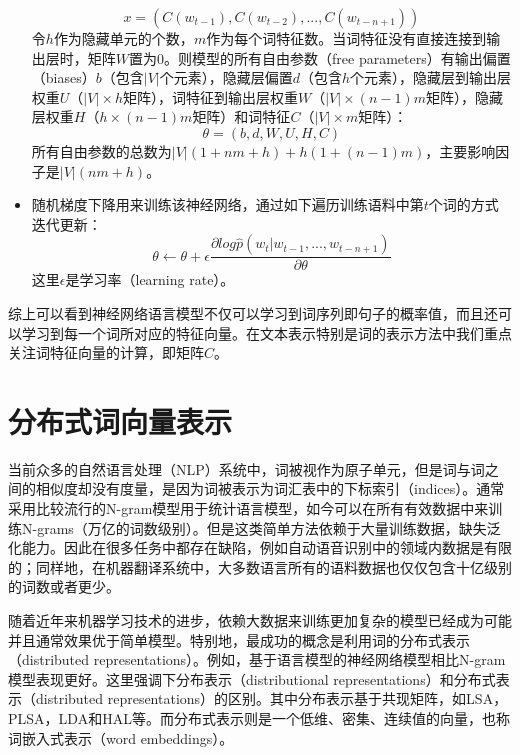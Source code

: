 \documentclass[master]{njuthesis}
\begin{document}
\begin{itemize}
		\begin{equation}
		x=(C(w_{t-1}), C(w_{t-2}), ..., C(w_{t-n+1}))
		\end{equation}
		令$h$作为隐藏单元的个数，$m$作为每个词特征数。当词特征没有直接连接到输出层时，矩阵$W$置为0。则模型的所有自由参数（free parameters）有输出偏置（biases）$b$（包含$|V|$个元素），隐藏层偏置$d$（包含$h$个元素），隐藏层到输出层权重$U$（$|V|\times h$矩阵），词特征到输出层权重$W$（$|V|\times (n-1)m$矩阵），隐藏层权重$H$（$h\times (n-1)m$矩阵）和词特征$C$（$|V|\times m$矩阵）：
		\begin{equation}
		\theta=(b,d,W,U,H,C)
		\end{equation}
		所有自由参数的总数为$|V|(1+nm+h)+h(1+(n-1)m)$，主要影响因子是$|V|(nm+h)$。
\item 随机梯度下降用来训练该神经网络，通过如下遍历训练语料中第$t$个词的方式迭代更新：
		\begin{equation}
		\theta \leftarrow \theta+\epsilon \frac{\partial log\hat{p}(w_t|w_{t-1}, ..., w_{t-n+1})}{\partial \theta}
		\end{equation}
		这里$\epsilon$是学习率（learning rate）。
\end{itemize}

综上可以看到神经网络语言模型不仅可以学习到词序列即句子的概率值，而且还可以学习到每一个词所对应的特征向量。在文本表示特别是词的表示方法中我们重点关注词特征向量的计算，即矩阵$C$。


\section{分布式词向量表示}\label{sec_chap2_word2vec}

当前众多的自然语言处理（NLP）系统中，词被视作为原子单元，但是词与词之间的相似度却没有度量，是因为词被表示为词汇表中的下标索引（indices）。通常采用比较流行的N-gram模型用于统计语言模型，如今可以在所有有效数据中来训练N-grams（万亿的词数级别\cite{brants2007large}）。但是这类简单方法依赖于大量训练数据，缺失泛化能力。因此在很多任务中都存在缺陷，例如自动语音识别中的领域内数据是有限的；同样地，在机器翻译系统中，大多数语言所有的语料数据也仅仅包含十亿级别的词数或者更少。

随着近年来机器学习技术的进步，依赖大数据来训练更加复杂的模型已经成为可能并且通常效果优于简单模型。特别地，最成功的概念是利用词的分布式表示（distributed representations）\cite{hinton1986learning}。例如，基于语言模型的神经网络模型相比N-gram模型表现更好\cite{bengio2003neural,schwenk2007continuous}。这里强调下分布表示（distributional representations）和分布式表示（distributed representations）的区别。其中分布表示基于共现矩阵，如LSA\cite{landauer1998introduction}，PLSA\cite{hofmann1999probabilistic}，LDA\cite{blei2003latent}和HAL\cite{lund1996producing}等。而分布式表示则是一个低维、密集、连续值的向量，也称词嵌入式表示（word embeddings）。
\end{document}
